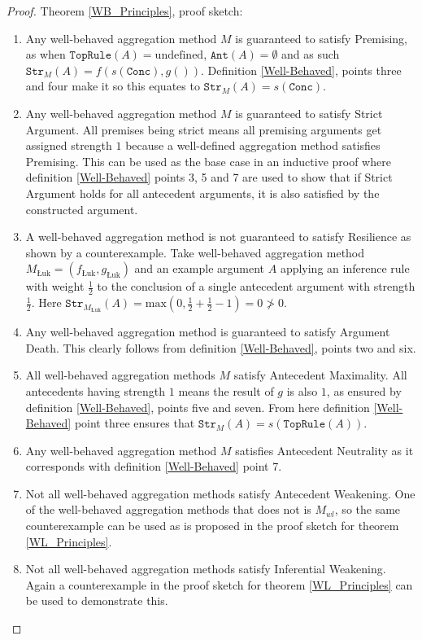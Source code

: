 \documentclass[runningheads]{llncs}
\newcommand{\Conc}{\texttt{Conc}}
\newcommand{\TopRule}{\texttt{TopRule}}
\newcommand{\Ant}{\texttt{Ant}}
\newcommand{\Str}{\texttt{Str}}
\begin{document}
\begin{proof}Theorem \ref{WB_Principles}, proof sketch:
\begin{enumerate}
    \item Any well-behaved aggregation method $M$ is guaranteed to satisfy Premising, as when $\TopRule(A) = \text{undefined}$, $\Ant(A) = \emptyset$ and as such $\Str_M(A) = f(s(\Conc),g())$. Definition \ref{Well-Behaved}, points three and four make it so this equates to $\Str_M(A) = s(\Conc)$.
    \item Any well-behaved aggregation method $M$ is guaranteed to satisfy Strict Argument. All premises being strict means all premising arguments get assigned strength $1$ because a well-defined aggregation method satisfies Premising. This can be used as the base case in an inductive proof where definition \ref{Well-Behaved} points 3, 5 and 7 are used to show that if Strict Argument holds for all antecedent arguments, it is also satisfied by the constructed argument.
    \item A well-behaved aggregation method is not guaranteed to satisfy Resilience as shown by a counterexample. Take well-behaved aggregation method $M_{\text{Łuk}} = ( f_{\text{Łuk}},  g_{\text{Łuk}})$ and an example argument $A$ applying an inference rule with weight $\frac{1}{2}$ to the conclusion of a single antecedent argument with strength $\frac{1}{2}$. Here $\Str_{M_{\text{Łuk}}}(A) = \text{max}(0,\frac{1}{2} + \frac{1}{2} - 1) = 0 \ngtr 0$.
    \item Any well-behaved aggregation method is guaranteed to satisfy Argument Death. This clearly follows from definition \ref{Well-Behaved}, points two and six.
    \item All well-behaved aggregation methods $M$ satisfy Antecedent Maximality. All antecedents having strength $1$ means the result of $g$ is also $1$, as ensured by definition \ref{Well-Behaved}, points five and seven. From here definition \ref{Well-Behaved} point three ensures that $\Str_M(A) = s(\TopRule(A))$.
    \item Any well-behaved aggregation method $M$ satisfies Antecedent Neutrality as it corresponds with definition \ref{Well-Behaved} point 7.
    \item Not all well-behaved aggregation methods satisfy Antecedent Weakening. One of the well-behaved aggregation methods that does not is $M_{wl}$, so the same counterexample can be used as is proposed in the proof sketch for theorem \ref{WL_Principles}.
    \item Not all well-behaved aggregation methods satisfy Inferential Weakening. Again a counterexample in the proof sketch for theorem \ref{WL_Principles} can be used to demonstrate this.

\end{enumerate}
\end{proof}
\end{document}
